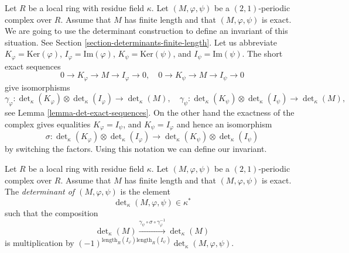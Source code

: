 \noindent
Let $R$ be a local ring with residue field $\kappa$.
Let $(M, \varphi, \psi)$ be a $(2, 1)$-periodic complex over $R$.
Assume that $M$ has finite length and that $(M, \varphi, \psi)$ is
exact. We are going to use the determinant construction to define
an invariant of this situation. See
Section \ref{section-determinants-finite-length}.
Let us abbreviate
$K_\varphi = \text{Ker}(\varphi)$,
$I_\varphi = \text{Im}(\varphi)$,
$K_\psi = \text{Ker}(\psi)$, and
$I_\psi = \text{Im}(\psi)$.
The short exact sequences
$$
0 \to K_\varphi \to M \to I_\varphi \to 0, \quad
0 \to K_\psi \to M \to I_\psi \to 0
$$
give isomorphisms
$$
\gamma_\varphi :
\det\nolimits_\kappa(K_\varphi)
\otimes
\det\nolimits_\kappa(I_\varphi)
\longrightarrow
\det\nolimits_\kappa(M), \quad
\gamma_\psi :
\det\nolimits_\kappa(K_\psi)
\otimes
\det\nolimits_\kappa(I_\psi)
\longrightarrow
\det\nolimits_\kappa(M),
$$
see Lemma \ref{lemma-det-exact-sequences}.
On the other hand the exactness of the complex gives equalities
$K_\varphi = I_\psi$, and $K_\psi = I_\varphi$
and hence an isomorphism
$$
\sigma :
\det\nolimits_\kappa(K_\varphi)
\otimes
\det\nolimits_\kappa(I_\varphi)
\longrightarrow
\det\nolimits_\kappa(K_\psi)
\otimes
\det\nolimits_\kappa(I_\psi)
$$
by switching the factors. Using this notation we can define our invariant.

\begin{definition}
\label{definition-periodic-determinant}
Let $R$ be a local ring with residue field $\kappa$.
Let $(M, \varphi, \psi)$ be a $(2, 1)$-periodic complex over $R$.
Assume that $M$ has finite length and that $(M, \varphi, \psi)$ is
exact. The {\it determinant of $(M, \varphi, \psi)$} is
the element
$$
\det\nolimits_\kappa(M, \varphi, \psi) \in \kappa^*
$$
such that the composition
$$
\det\nolimits_\kappa(M)
\xrightarrow{\gamma_\psi \circ \sigma \circ \gamma_\varphi^{-1}}
\det\nolimits_\kappa(M)
$$
is multiplication by
$(-1)^{\text{length}_R(I_\varphi)\text{length}_R(I_\psi)}
\det\nolimits_\kappa(M, \varphi, \psi)$.
\end{definition}

